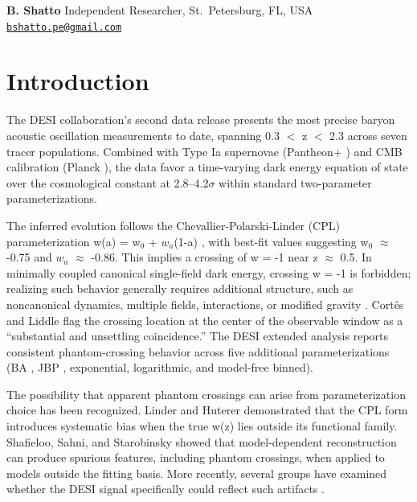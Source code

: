 \textbf{B. Shatto} Independent Researcher, St.~Petersburg, FL, USA
\href{mailto:bshatto.pe@gmail.com}{\nolinkurl{bshatto.pe@gmail.com}}

\section{Introduction}\label{sec:intro}

The DESI collaboration's second data release \cite{ref1} presents the most
precise baryon acoustic oscillation measurements to date, spanning 0.3
$<$ z $<$ 2.3 across seven tracer populations. Combined
with Type Ia supernovae (Pantheon+ \cite{ref2}) and CMB calibration (Planck
\cite{ref3}), the data favor a time-varying dark energy equation of state
over the cosmological constant at 2.8--4.2$\sigma$ within standard
two-parameter parameterizations.

The inferred evolution follows the Chevallier-Polarski-Linder (CPL)
parameterization w(a) = w$_0$ + $w_a$(1-a) \cite{ref4,ref5}, with best-fit values
suggesting w$_0$ $\approx$ -0.75 and $w_a$ $\approx$ -0.86. This implies a crossing of w =
-1 near z $\approx$ 0.5. In minimally coupled canonical single-field dark
energy, crossing w = -1 is forbidden; realizing such behavior generally
requires additional structure, such as noncanonical dynamics, multiple
fields, interactions, or modified gravity \cite{ref6,ref7}. Cort\^{e}s and Liddle
\cite{ref8} flag the crossing location at the center of the observable
window as a ``substantial and unsettling coincidence.'' The DESI
extended analysis \cite{ref9} reports consistent phantom-crossing behavior
across five additional parameterizations (BA \cite{ref10}, JBP \cite{ref11},
exponential, logarithmic, and model-free binned).

The possibility that apparent phantom crossings can arise from
parameterization choice has been recognized. Linder and Huterer \cite{ref12}
demonstrated that the CPL form introduces systematic bias when the true
w(z) lies outside its functional family. Shafieloo, Sahni, and
Starobinsky \cite{ref13} showed that model-dependent reconstruction can
produce spurious features, including phantom crossings, when applied to
models outside the fitting basis. More recently, several groups have
examined whether the DESI signal specifically could reflect such
artifacts \cite{ref8,ref14}.


